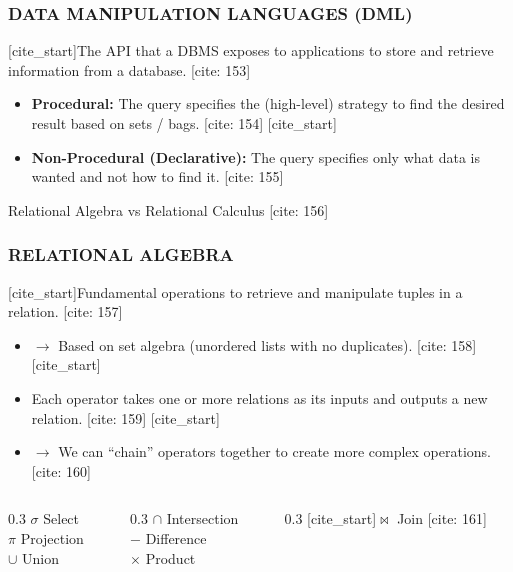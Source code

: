 \documentclass[aspectratio=169]{beamer}
\begin{document}
\begin{frame}
    \frametitle{DATA MANIPULATION LANGUAGES (DML)}
    [cite_start]The API that a DBMS exposes to applications to store and retrieve information from a database. [cite: 153]
    \begin{itemize}
        [cite_start]\item \textbf{Procedural:} The query specifies the (high-level) strategy to find the desired result based on sets / bags. [cite: 154]
        [cite_start]\item \textbf{Non-Procedural (Declarative):} The query specifies only what data is wanted and not how to find it. [cite: 155]
    \end{itemize}
    Relational Algebra vs Relational Calculus [cite: 156]
\end{frame}

\begin{frame}
    \frametitle{RELATIONAL ALGEBRA}
    [cite_start]Fundamental operations to retrieve and manipulate tuples in a relation. [cite: 157]
    \begin{itemize}
        [cite_start]\item $\rightarrow$ Based on set algebra (unordered lists with no duplicates). [cite: 158]
        [cite_start]\item Each operator takes one or more relations as its inputs and outputs a new relation. [cite: 159]
        [cite_start]\item $\rightarrow$ We can ``chain'' operators together to create more complex operations. [cite: 160]
    \end{itemize}
    \vspace{1em}
    \begin{columns}
        \begin{column}{0.3\textwidth}
            $\sigma$ Select\\
            $\pi$ Projection\\
            $\cup$ Union
        \end{column}
        \begin{column}{0.3\textwidth}
            $\cap$ Intersection\\
            $-$ Difference\\
            $\times$ Product
        \end{column}
        \begin{column}{0.3\textwidth}
            [cite_start]$\bowtie$ Join [cite: 161]
        \end{column}
    \end{columns}
\end{frame}
\end{document}

